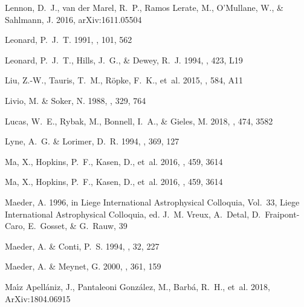 \documentclass{aa}
\begin{document}
\begin{thebibliography}{242}
{Lennon}, D.~J., {van der Marel}, R.~P., {Ramos Lerate}, M., {O'Mullane}, W.,
  \& {Sahlmann}, J. 2016, arXiv:1611.05504

{Leonard}, P.~J.~T. 1991, \aj, 101, 562

{Leonard}, P.~J.~T., {Hills}, J.~G., \& {Dewey}, R.~J. 1994, \apjl, 423, L19

{Liu}, Z.-W., {Tauris}, T.~M., {R{\"o}pke}, F.~K., {et~al.} 2015, \aap, 584,
  A11

{Livio}, M. \& {Soker}, N. 1988, \apj, 329, 764

{Lucas}, W.~E., {Rybak}, M., {Bonnell}, I.~A., \& {Gieles}, M. 2018, \mnras,
  474, 3582

{Lyne}, A.~G. \& {Lorimer}, D.~R. 1994, \nat, 369, 127

{Ma}, X., {Hopkins}, P.~F., {Kasen}, D., {et~al.} 2016{}, \mnras,
  459, 3614

{Ma}, X., {Hopkins}, P.~F., {Kasen}, D., {et~al.} 2016{}, \mnras,
  459, 3614

{Maeder}, A. 1996, in Liege International Astrophysical Colloquia, Vol.~33,
  Liege International Astrophysical Colloquia, ed. J.~M. {Vreux}, A.~{Detal},
  D.~{Fraipont-Caro}, E.~{Gosset}, \& G.~{Rauw}, 39

{Maeder}, A. \& {Conti}, P.~S. 1994, \araa, 32, 227

{Maeder}, A. \& {Meynet}, G. 2000, \aap, 361, 159

{Ma{\'{\i}}z Apell{\'a}niz}, J., {Pantaleoni Gonz{\'a}lez}, M., {Barb{\'a}},
  R.~H., {et~al.} 2018, ArXiv:1804.06915


\end{thebibliography}
\end{document}
